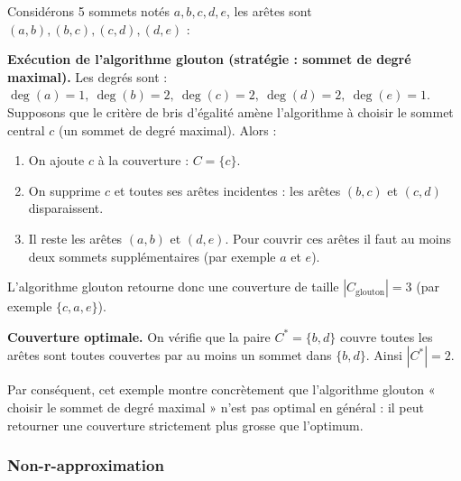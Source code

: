 \documentclass[11pt,a4paper]{article}
\begin{document}
Considérons 5 sommets notés \(a,b,c,d,e\), les arêtes sont \((a,b),(b,c),(c,d),(d,e)\) :
\begin{figure}[H]
    \centering
\end{figure}

\textbf{Exécution de l'algorithme glouton (stratégie : sommet de degré maximal).}  
Les degrés sont : $\deg(a)=1,\ \deg(b)=2,\ \deg(c)=2,\ \deg(d)=2,\ \deg(e)=1$.  
Supposons que le critère de bris d'égalité amène l'algorithme à choisir le sommet central \(c\) (un sommet de degré maximal). Alors :
\begin{enumerate}
  \item On ajoute \(c\) à la couverture : $C=\{c\}$.
  \item On supprime \(c\) et toutes ses arêtes incidentes : les arêtes $(b,c)$ et $(c,d)$ disparaissent.
  \item Il reste les arêtes $(a,b)$ et $(d,e)$. Pour couvrir ces arêtes il faut au moins deux sommets supplémentaires (par exemple \(a\) et \(e\)).
\end{enumerate}
L'algorithme glouton retourne donc une couverture de taille $|C_{\text{glouton}}|=3$ (par exemple $\{c,a,e\}$).

\medskip

\textbf{Couverture optimale.}  
On vérifie que la paire $C^{*}=\{b,d\}$ couvre toutes les arêtes sont toutes couvertes par au moins un sommet dans $\{b,d\}$. Ainsi $|C^{*}|=2$.

Par conséquent, cet exemple montre concrètement que l'algorithme glouton « choisir le sommet de degré maximal » n'est pas optimal en général : il peut retourner une couverture strictement plus grosse que l'optimum.

\subsubsection{Non-r-approximation}
\end{document}
